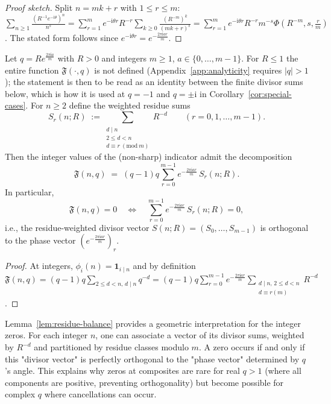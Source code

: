 \begin{proof}[Proof sketch]
Split $n=mk+r$ with $1\le r\le m$:
$\sum_{n\ge1}\frac{(R^{-1} e^{-\mathrm{i}\theta})^{n}}{n^s}
=\sum_{r=1}^{m} e^{-\mathrm{i}\theta r} R^{-r}\sum_{k\ge0}\frac{(R^{-m})^{k}}{(mk+r)^s}
=\sum_{r=1}^{m} e^{-\mathrm{i}\theta r} R^{-r} m^{-s}\Phi\!\left(R^{-m},s,\tfrac{r}{m}\right)$.
The stated form follows since $e^{-\mathrm{i}\theta r}=e^{-\tfrac{2\pi \mathrm{i} a r}{m}}$.
\end{proof}

\begin{lemma}
\label{lem:residue-balance}
Let $q=R e^{\tfrac{2\pi \mathrm{i} a}{m}}$ with $R>0$ and integers $m\ge1$, $a\in\{0,\dots,m-1\}$. For $R\le1$ the entire function $\mathfrak F(\cdot,q)$ is not defined (Appendix~\ref{app:analyticity} requires $|q|>1$); the statement is then to be read as an identity between the finite divisor sums below, which is how it is used at $q=-1$ and $q=\pm\mathrm{i}$ in Corollary~\ref{cor:special-cases}.
For $n\ge2$ define the weighted residue sums
\[
S_{r}(n;R)\;:=\!\!\sum_{\substack{d\mid n\\ 2\le d<n\\ d\equiv r\ (\mathrm{mod}\ m)}}\! R^{-d}\qquad (r=0,1,\dots,m-1).
\]
Then the integer values of the (non-sharp) indicator admit the decomposition
\[
\mathfrak F(n,q)\;=\;(q-1)q\sum_{r=0}^{m-1} e^{-\tfrac{2\pi \mathrm{i} a r}{m}}\,S_{r}(n;R).
\]
In particular,
\[
\mathfrak F(n,q)=0
\quad\Longleftrightarrow\quad
\sum_{r=0}^{m-1} e^{-\tfrac{2\pi \mathrm{i} a r}{m}}\,S_{r}(n;R)=0,
\]
i.e., the residue-weighted divisor vector $S(n;R)=(S_0,\dots,S_{m-1})$ is orthogonal to the phase vector
$(e^{-\tfrac{2\pi \mathrm{i} a r}{m}})_{r}$.
\end{lemma}

\begin{proof}
At integers, $\phi_i(n)=\mathbf 1_{i\mid n}$ and by definition
$\mathfrak F(n,q)=(q-1)q\sum_{2\le d<n,\,d\mid n} q^{-d}
=(q-1)q\sum_{r=0}^{m-1} e^{-\tfrac{2\pi \mathrm{i} a r}{m}}
\sum_{\substack{d\mid n,\,2\le d<n\\ d\equiv r (m)}} R^{-d}$.
\end{proof}

\begin{remark}
Lemma~\ref{lem:residue-balance} provides a geometric interpretation for the integer zeros. For each integer $n$, one can associate a vector of its divisor sums, weighted by $R^{-d}$ and partitioned by residue classes modulo $m$. A zero occurs if and only if this "divisor vector" is perfectly orthogonal to the "phase vector" determined by $q$'s angle. This explains why zeros at composites are rare for real $q>1$ (where all components are positive, preventing orthogonality) but become possible for complex $q$ where cancellations can occur.
\end{remark}


